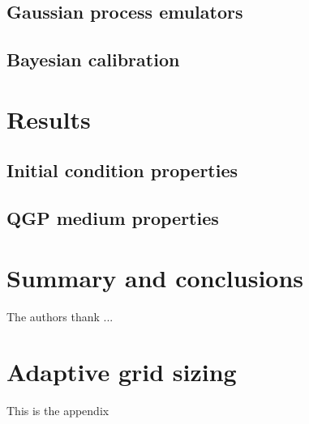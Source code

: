 \documentclass[aps,prc,reprint,amsmath,nofootinbib]{revtex4-1}
\begin{document}
\lipsum[5]


\subsection{Gaussian process emulators}

\lipsum[5]

\subsection{Bayesian calibration}

\lipsum[5]

\section{Results}
\label{results}

\lipsum[5]

\subsection{Initial condition properties}

\subsection{QGP medium properties}

\section{Summary and conclusions}
\label{summary}

\begin{acknowledgments}
  The authors thank ...
\end{acknowledgments}

\appendix*

\section{Adaptive grid sizing}
\label{appendix}
This is the appendix


\end{document}
